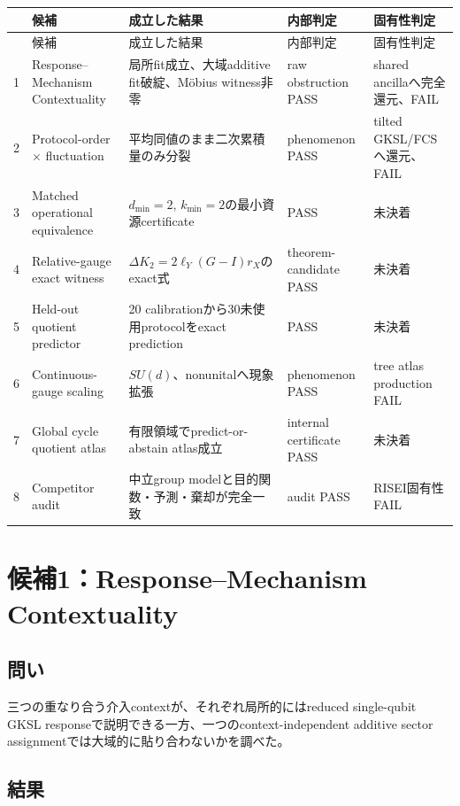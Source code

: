 \documentclass[11pt,a4paper,uplatex,dvipdfmx]{bxjsarticle}
\theoremstyle{remark}
\begin{document}
\begin{longtable}{p{0.35cm}p{3.35cm}p{3.85cm}p{2.15cm}p{2.35cm}}
\toprule
 & 候補 & 成立した結果 & 内部判定 & 固有性判定 \\
\midrule
\endfirsthead
\toprule
 & 候補 & 成立した結果 & 内部判定 & 固有性判定 \\
\midrule
\endhead
1 & Response--Mechanism Contextuality & 局所fit成立、大域additive fit破綻、Möbius witness非零 & raw obstruction PASS & shared ancillaへ完全還元、FAIL \\
2 & Protocol-order $\times$ fluctuation & 平均同値のまま二次累積量のみ分裂 & phenomenon PASS & tilted GKSL/FCSへ還元、FAIL \\
3 & Matched operational equivalence & $d_{\min}=2$, $k_{\min}=2$の最小資源certificate & PASS & 未決着 \\
4 & Relative-gauge exact witness & $\Delta K_2=2\ell_Y(G-I)r_X$のexact式 & theorem-candidate PASS & 未決着 \\
5 & Held-out quotient predictor & 20 calibrationから30未使用protocolをexact prediction & PASS & 未決着 \\
6 & Continuous-gauge scaling & $SU(d)$、nonunitalへ現象拡張 & phenomenon PASS & tree atlas production FAIL \\
7 & Global cycle quotient atlas & 有限領域でpredict-or-abstain atlas成立 & internal certificate PASS & 未決着 \\
8 & Competitor audit & 中立group modelと目的関数・予測・棄却が完全一致 & audit PASS & RISEI固有性 FAIL \\
\bottomrule
\end{longtable}

\section{候補1：Response--Mechanism Contextuality}

\subsection{問い}

三つの重なり合う介入contextが、それぞれ局所的にはreduced single-qubit GKSL responseで説明できる一方、一つのcontext-independent additive sector assignmentでは大域的に貼り合わないかを調べた。

\subsection{結果}
\end{document}

